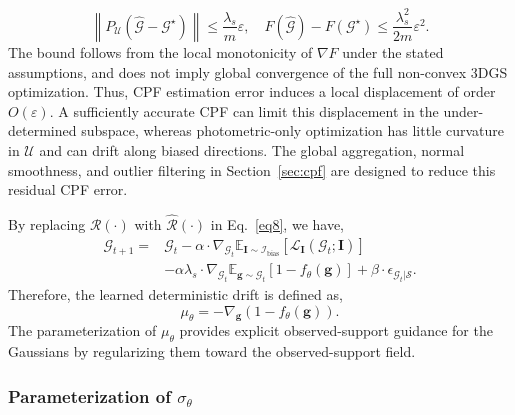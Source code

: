\documentclass[lettersize,journal]{IEEEtran}
\begin{document}
\begin{equation}
    \left\|P_{\mathcal{U}}(\widehat{\mathcal{G}}-\mathcal{G}^{\star})\right\|
    \le \frac{\lambda_s}{m}\varepsilon, \quad
    F(\widehat{\mathcal{G}})-F(\mathcal{G}^{\star})\le \frac{\lambda_s^2}{2m}\varepsilon^2 .
    \label{eq12_bound}
\end{equation}
The bound follows from the local monotonicity of $\nabla F$ under the stated assumptions, and does not imply global convergence of the full non-convex 3DGS optimization.
Thus, CPF estimation error induces a local displacement of order $O(\varepsilon)$. A sufficiently accurate CPF can limit this displacement in the under-determined subspace, whereas photometric-only optimization has little curvature in $\mathcal{U}$ and can drift along biased directions.
The global aggregation, normal smoothness, and outlier filtering in Section~\ref{sec:cpf} are designed to reduce this residual CPF error.

By replacing $\mathcal{R}(\cdot)$ with $\widehat{\mathcal{R}}(\cdot)$ in Eq.~\ref{eq8}, we have, 
\begin{equation}
    \begin{aligned}
    \mathcal{G}_{t+1} = &\mathcal{G}_t - \alpha \cdot \nabla_{\mathcal{G}_t} \mathbb{E}_{\mathbf{I}\sim\mathcal{I}_{\text{bias}}}\!\left[\mathcal{L}_{\mathbf{I}}(\mathcal{G}_t;\mathbf{I})\right] \\
    &- \alpha \lambda_s \cdot \nabla_{\mathcal{G}_t} \mathbb{E}_{\mathbf{g} \sim \mathcal{G}_t} \left[ 1 - f_{\theta}( \mathbf{g} ) \right] + \beta \cdot \epsilon_{\mathcal{G}_t \vert \mathcal{S}}.
    \end{aligned}
    \label{eq13}
\end{equation}
Therefore, the learned deterministic drift is defined as, 
\begin{equation}
    \mu_{\theta} = -  \nabla_{\mathbf{g}}  (1 - f_{\theta}(\mathbf{g})).
    \label{eq13.1}
\end{equation}
The parameterization of $\mu_{\theta}$ provides explicit observed-support guidance for the Gaussians by regularizing them toward the observed-support field.

\subsubsection{Parameterization of \texorpdfstring{$\sigma_{\theta}$}{sigma-theta}}
\end{document}
